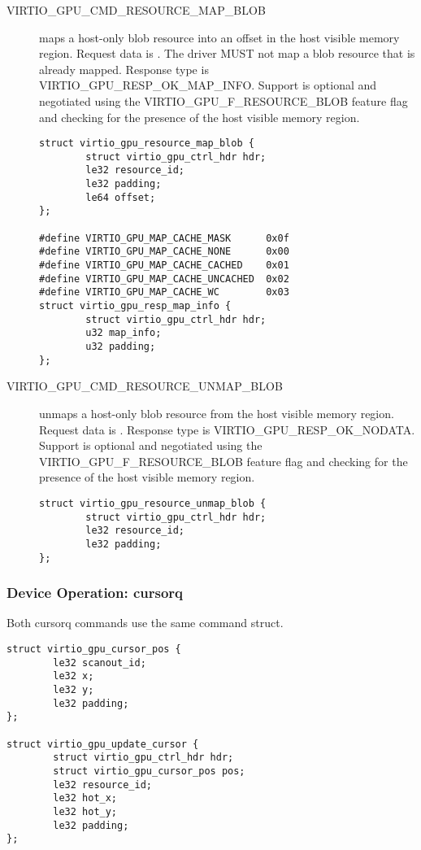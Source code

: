 \begin{description}
\item[VIRTIO_GPU_CMD_RESOURCE_MAP_BLOB] maps a host-only
  blob resource into an offset in the host visible memory region. Request
  data is .  The driver MUST
  not map a blob resource that is already mapped.  Response type is
  VIRTIO_GPU_RESP_OK_MAP_INFO. Support is optional and negotiated
  using the VIRTIO_GPU_F_RESOURCE_BLOB feature flag and checking for
  the presence of the host visible memory region.

\begin{lstlisting}
struct virtio_gpu_resource_map_blob {
        struct virtio_gpu_ctrl_hdr hdr;
        le32 resource_id;
        le32 padding;
        le64 offset;
};

#define VIRTIO_GPU_MAP_CACHE_MASK      0x0f
#define VIRTIO_GPU_MAP_CACHE_NONE      0x00
#define VIRTIO_GPU_MAP_CACHE_CACHED    0x01
#define VIRTIO_GPU_MAP_CACHE_UNCACHED  0x02
#define VIRTIO_GPU_MAP_CACHE_WC        0x03
struct virtio_gpu_resp_map_info {
        struct virtio_gpu_ctrl_hdr hdr;
        u32 map_info;
        u32 padding;
};
\end{lstlisting}

\item[VIRTIO_GPU_CMD_RESOURCE_UNMAP_BLOB] unmaps a
  host-only blob resource from the host visible memory region. Request data
  is .  Response type is
  VIRTIO_GPU_RESP_OK_NODATA.  Support is optional and negotiated
  using the VIRTIO_GPU_F_RESOURCE_BLOB feature flag and checking for
  the presence of the host visible memory region.

\begin{lstlisting}
struct virtio_gpu_resource_unmap_blob {
        struct virtio_gpu_ctrl_hdr hdr;
        le32 resource_id;
        le32 padding;
};
\end{lstlisting}

\end{description}

\subsubsection{Device Operation: cursorq}\label{sec:Device Types / GPU Device / Device Operation / Device Operation: cursorq}

Both cursorq commands use the same command struct.

\begin{lstlisting}
struct virtio_gpu_cursor_pos {
        le32 scanout_id;
        le32 x;
        le32 y;
        le32 padding;
};

struct virtio_gpu_update_cursor {
        struct virtio_gpu_ctrl_hdr hdr;
        struct virtio_gpu_cursor_pos pos;
        le32 resource_id;
        le32 hot_x;
        le32 hot_y;
        le32 padding;
};
\end{lstlisting}

